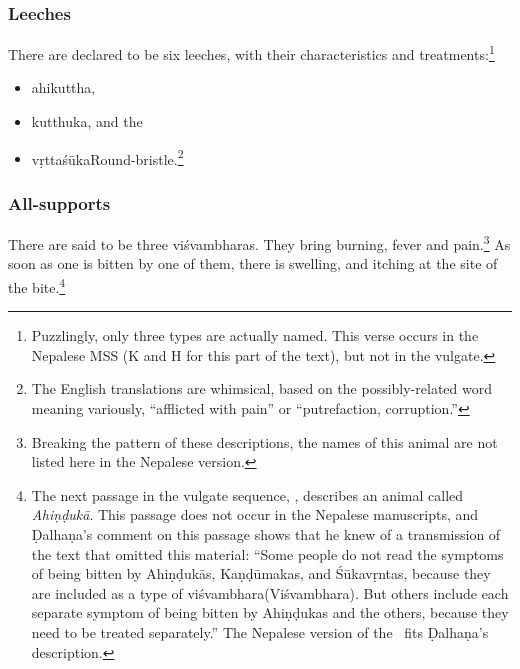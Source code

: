 \begin{translation}
\subsubsection{Leeches}

\item[31 add]

There are declared to be six leeches, with their characteristics and 
treatments:\footnote{Puzzlingly, only three types are actually named.  This verse 
occurs in the Nepalese MSS (K and H for this part of the text), but not in the 
vulgate.}
\begin{itemize}
    \item \Gls{ahikuttha},
    \item \Gls{kutthuka}, and the
    \item \Gls{vṛttaśūka}{Round-bristle}.\footnote{The English translations are 
    whimsical, based on the possibly-related word  meaning variously, 
    “afflicted with pain” or “putrefaction, corruption.”}
\end{itemize}

\subsubsection{All-supports}
\item[32 verse]

There are said to be three \Glspl{viśvambhara}.  They bring burning,
fever and pain.\footnote{Breaking the pattern of these descriptions,
    the names of this animal are not listed here in the Nepalese version.}
    As soon as one is bitten by one of them, there is swelling, and
    itching at the site of the bite.\footnote{The next passage in the
        vulgate sequence, , describes an animal called
        \emph{Ahiṇḍukā}.  This passage does not occur in the Nepalese
        manuscripts, and Ḍalhaṇa's comment on this passage shows that he knew
        of a transmission of the text that omitted this material:  “Some
        people do not read the symptoms of being bitten by Ahiṇḍukās,
        Kaṇḍūmakas, and Śūkavṛntas, because they are included as a type of
        \Gls{viśvambhara}(Viśvambhara). But others include each separate
        symptom of being bitten by Ahiṇḍukas and the others, because they need
        to be treated separately.”    The Nepalese version of the \SS\ fits
        Ḍalhaṇa's description.}
   
\item[34 verses 1, 2]   


\end{translation}
